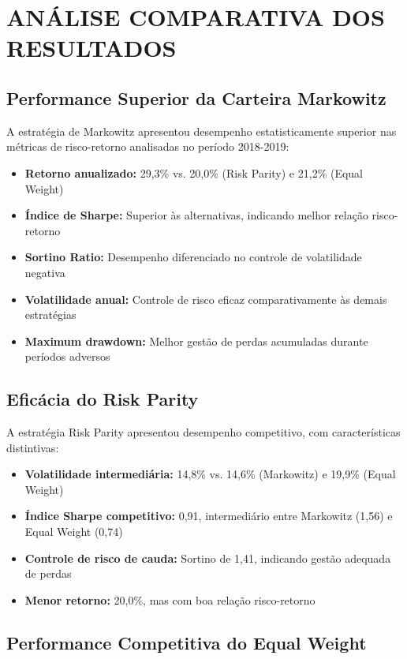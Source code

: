 \section{ANÁLISE COMPARATIVA DOS RESULTADOS}

\subsection{Performance Superior da Carteira Markowitz}

A estratégia de Markowitz apresentou desempenho estatisticamente superior nas métricas de risco-retorno analisadas no período 2018-2019:

\begin{itemize}
    \item \textbf{Retorno anualizado:} 29,3\% vs. 20,0\% (Risk Parity) e 21,2\% (Equal Weight)
    \item \textbf{Índice de Sharpe:} Superior às alternativas, indicando melhor relação risco-retorno
    \item \textbf{Sortino Ratio:} Desempenho diferenciado no controle de volatilidade negativa
    \item \textbf{Volatilidade anual:} Controle de risco eficaz comparativamente às demais estratégias
    \item \textbf{Maximum drawdown:} Melhor gestão de perdas acumuladas durante períodos adversos
\end{itemize}

\subsection{Eficácia do Risk Parity}

A estratégia Risk Parity apresentou desempenho competitivo, com características distintivas:

\begin{itemize}
    \item \textbf{Volatilidade intermediária:} 14,8\% vs. 14,6\% (Markowitz) e 19,9\% (Equal Weight)
    \item \textbf{Índice Sharpe competitivo:} 0,91, intermediário entre Markowitz (1,56) e Equal Weight (0,74)
    \item \textbf{Controle de risco de cauda:} Sortino de 1,41, indicando gestão adequada de perdas
    \item \textbf{Menor retorno:} 20,0\%, mas com boa relação risco-retorno
\end{itemize}

\subsection{Performance Competitiva do Equal Weight}

